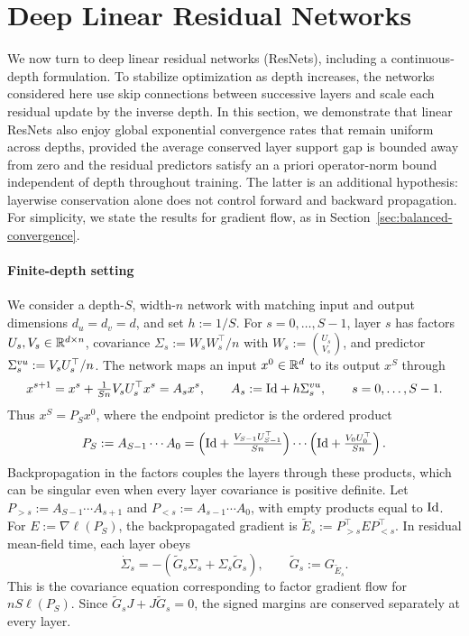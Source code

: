 \section{Deep Linear Residual Networks}
\vspace{-0.5em}
\label{sec:resnets}\label{sec:deep-resnets}
We now turn to deep linear residual networks (ResNets), including a continuous-depth formulation.
To stabilize optimization as depth increases, the networks considered here use skip connections between successive layers and scale each residual update by the inverse depth.
In this section, we demonstrate that linear ResNets also enjoy global exponential convergence rates that remain uniform across depths,
provided the average conserved layer support gap is bounded away from zero and the residual predictors satisfy an a priori operator-norm bound independent of depth throughout training.
The latter is an additional hypothesis: layerwise conservation alone does not control forward and backward propagation.
For simplicity, we state the results for gradient flow, as in Section~\ref{sec:balanced-convergence}.

\paragraph{Finite-depth setting}
We consider a depth-$S$, width-$n$ network with matching input and output dimensions $d_u=d_v=d$, and set $h:=1/S$.
For $s=0,\ldots,S-1$, layer $s$ has factors $U_s,V_s\in\mathbb{R}^{d\times n}$, covariance $\Sigma_s:=W_sW_s^\top/n$ with $W_s:=\binom{U_s}{V_s}$, and predictor $\Sigma^{vu}_s:=V_sU_s^\top/n$.
The network maps an input $x^0\in\mathbb{R}^d$ to its output $x^S$ through
\[
 x^{s+1}=x^s+\tfrac{1}{Sn}V_sU_s^\top x^s=A_sx^s, \qquad A_s:=\mathrm{Id}+h\Sigma^{vu}_s,\qquad s=0,\ldots,S-1.
\]
Thus $x^S=P_Sx^0$, where the endpoint predictor is the ordered product
\[
 P_S:=A_{S-1}\cdots A_0
 =\left(\mathrm{Id}+\tfrac{V_{S-1}U_{S-1}^\top}{Sn}\right)\cdots
  \left(\mathrm{Id}+\tfrac{V_0U_0^\top}{Sn}\right).
\]
Backpropagation in the factors couples the layers through these products, which can be singular even when every layer covariance is positive definite.
Let $P_{>s}:=A_{S-1}\cdots A_{s+1}$ and $P_{<s}:=A_{s-1}\cdots A_0$, with empty products equal to $\mathrm{Id}$.
For $E:=\nabla\ell(P_S)$, the backpropagated gradient is $\widetilde E_s:=P_{>s}^\top E P_{<s}^\top$.
In residual mean-field time, each layer obeys
\begin{equation}\label{eq:resnet-layer-bures}
 \dot\Sigma_s=-(\widetilde G_s\Sigma_s+\Sigma_s\widetilde G_s),
 \qquad \widetilde G_s:=G_{\widetilde E_s}.
\end{equation}
This is the covariance equation corresponding to factor gradient flow for $nS\ell(P_S)$. Since $\widetilde G_sJ+J\widetilde G_s=0$,
the signed margins are conserved separately at every layer.

